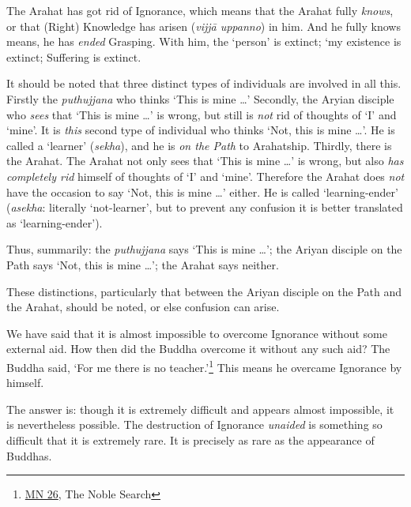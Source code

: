 The Arahat has got rid of Ignorance, which means that the Arahat fully \emph{knows}, or that (Right) Knowledge has arisen (\textit{vijjā uppanno}) in him. And he fully knows means, he has \emph{ended} Grasping. With him, the `person' is extinct; `my existence is extinct; Suffering is extinct.

It should be noted that three distinct types of individuals are involved in all this. Firstly the \textit{puthujjana} who thinks `This is mine \ldots\hspace{0pt}' Secondly, the Aryian disciple who \emph{sees} that `This is mine \ldots\hspace{0pt}' is wrong, but still is \emph{not} rid of thoughts of `I' and `mine'. It is \emph{this} second type of individual who thinks `Not, this is mine \ldots\hspace{0pt}'. He is called a `learner' (\textit{sekha}), and he is \emph{on the Path} to Arahatship. Thirdly, there is the Arahat. The Arahat not only sees that `This is mine \ldots\hspace{0pt}' is wrong, but also \emph{has completely rid} himself of thoughts of `I' and `mine'. Therefore the Arahat does \emph{not} have the occasion to say `Not, this is mine \ldots\hspace{0pt}' either. He is called `learning-ender' (\textit{asekha}: literally `not-learner', but to prevent any confusion it is better translated as `learning-ender').

Thus, summarily: the \textit{puthujjana} says `This is mine \ldots\hspace{0pt}'; the Ariyan disciple on the Path says `Not, this is mine \ldots\hspace{0pt}'; the Arahat says neither.

These distinctions, particularly that between the Ariyan disciple on the Path and the Arahat, should be noted, or else confusion can arise.

We have said that it is almost impossible to overcome Ignorance without some external aid. How then did the Buddha overcome it without any such aid? The Buddha said, `For me there is no teacher.'\footnote{\href{https://suttacentral.net/mn26/en/bodhi}{MN 26}, The Noble Search} This means he overcame Ignorance by himself.

The answer is: though it is extremely difficult and appears almost impossible, it is nevertheless possible. The destruction of Ignorance \emph{unaided} is something so difficult that it is extremely rare. It is precisely as rare as the appearance of Buddhas.
